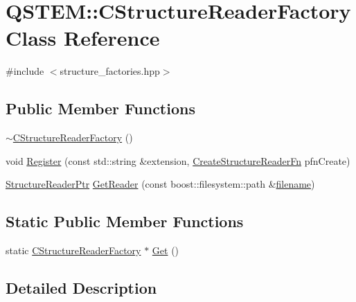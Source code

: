 \hypertarget{class_q_s_t_e_m_1_1_c_structure_reader_factory}{\section{Q\-S\-T\-E\-M\-:\-:C\-Structure\-Reader\-Factory Class Reference}
\label{class_q_s_t_e_m_1_1_c_structure_reader_factory}
}


{\ttfamily \#include $<$structure\-\_\-factories.\-hpp$>$}

\subsection*{Public Member Functions}
\begin{DoxyCompactItemize}
\item 
\hyperlink{class_q_s_t_e_m_1_1_c_structure_reader_factory_a00eb8783d122381c99e119c6bab3a1b0}{$\sim$\-C\-Structure\-Reader\-Factory} ()
\item 
void \hyperlink{class_q_s_t_e_m_1_1_c_structure_reader_factory_a9f898e120acb461a33449993069fb8b7}{Register} (const std\-::string \&extension, \hyperlink{namespace_q_s_t_e_m_a3bd4c40f6c26749ba931d19901e84255}{Create\-Structure\-Reader\-Fn} pfn\-Create)
\item 
\hyperlink{namespace_q_s_t_e_m_a3496fb9b2de0f3b3350f9b0d5206bc75}{Structure\-Reader\-Ptr} \hyperlink{class_q_s_t_e_m_1_1_c_structure_reader_factory_a3cf9c0d4971976bdd8e1702c0a8b0917}{Get\-Reader} (const boost\-::filesystem\-::path \&\hyperlink{write_fields2_file_8m_af3723aa817dbb65282d5e1db81f08ad8}{filename})
\end{DoxyCompactItemize}
\subsection*{Static Public Member Functions}
\begin{DoxyCompactItemize}
\item 
static \hyperlink{class_q_s_t_e_m_1_1_c_structure_reader_factory}{C\-Structure\-Reader\-Factory} $\ast$ \hyperlink{class_q_s_t_e_m_1_1_c_structure_reader_factory_a2f391855e6cf92c64da7ee7815bc556c}{Get} ()
\end{DoxyCompactItemize}


\subsection{Detailed Description}


